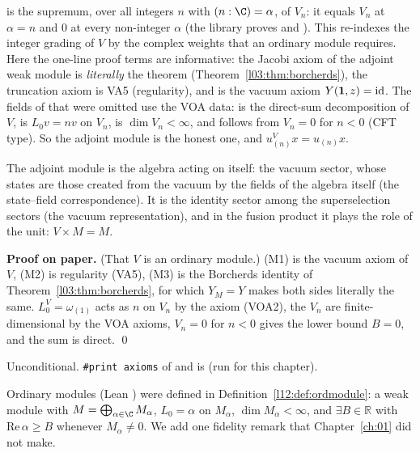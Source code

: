 \begin{dictionary}
 is the supremum, over all integers $n$ with $(n:\C)=\alpha$, of $V_n$: it equals $V_n$ at $\alpha=n$ and $0$ at every
non-integer $\alpha$ (the library proves  and ). This re-indexes the integer grading of $V$ by the complex
weights that an ordinary module requires. Here the one-line proof terms are informative: the Jacobi axiom of the adjoint weak module is
\emph{literally} the theorem  (Theorem~\ref{l03:thm:borcherds}), the truncation axiom is VA5 (regularity), and
 is the vacuum axiom $Y(\mathbf{1},z)=\mathrm{id}$. The fields of  that were omitted use the VOA data:
 is the direct-sum decomposition of $V$,  is $L_0v=nv$ on $V_n$,  is $\dim V_n<\infty$, and
 follows from $V_n=0$ for $n<0$ (CFT type). So the adjoint module is the honest one, and
$u^V_{(n)}x = u_{(n)}x$.
\end{dictionary}

\begin{physics}
The adjoint module is the algebra acting on itself: the vacuum sector, whose states are those created from the vacuum by the fields of the
algebra itself (the state--field correspondence). It is the identity sector among the superselection sectors (the vacuum representation),
and in the fusion product it plays the role of the unit: $V\times M = M$.
\end{physics}

\textbf{Proof on paper.} (That $V$ is an ordinary module.) (M1) is the vacuum axiom of $V$, (M2) is regularity (VA5), (M3) is the Borcherds identity
of Theorem~\ref{l03:thm:borcherds}, for which $Y_M=Y$ makes both sides literally the same. $L_0^V=\omega_{(1)}$ acts as $n$ on $V_n$ by the
axiom (VOA2), the $V_n$ are finite-dimensional by the VOA axioms, $V_n=0$ for $n<0$ gives the lower bound $B=0$, and the sum is direct. \qed

\begin{status}
Unconditional. \texttt{\#print axioms} of  and  is
\lean{[propext, Classical.}\allowbreak{}\allowbreak\lean{sound]} (run for this chapter).
\end{status}

Ordinary modules (Lean ) were defined in Definition~\ref{l12:def:ordmodule}: a weak
module with $M = \bigoplus_{\alpha\in\C}M_\alpha$, $L_0 = \alpha$ on $M_\alpha$, $\dim M_\alpha<\infty$,
and $\exists B\in\mathbb R$ with $\mathrm{Re}\,\alpha\ge B$ whenever $M_\alpha\neq0$. We add one
fidelity remark that Chapter~\ref{ch:01} did not make.

